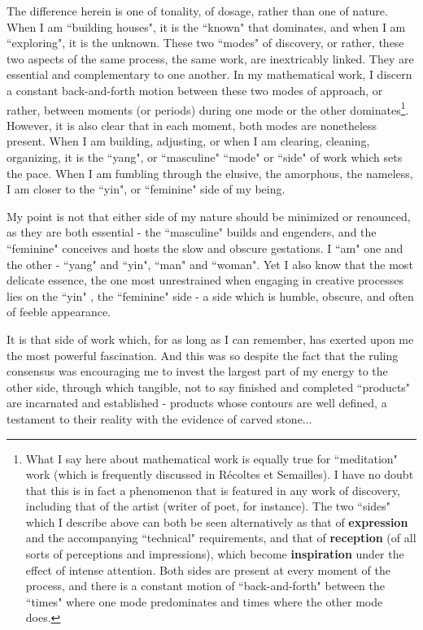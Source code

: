 The difference herein is one of tonality, of dosage, rather than one of nature. When I am ``building houses", it is the ``known" that dominates, and when I am ``exploring", it is the unknown. These two ``modes" of discovery, or rather, these two aspects of the same process, the same work, are inextricably linked. They are essential and complementary to one another. In my mathematical work, I discern a constant back-and-forth motion between these two modes of approach, or rather, between moments (or periods) during one mode or the other dominates\footnote{What I say here about mathematical work is equally true for ``meditation" work (which is frequently discussed in R\'ecoltes et Semailles). I have no doubt that this is in fact a phenomenon that is featured in any work of discovery, including that of the artist (writer of poet, for instance). The two ``sides" which I describe above can both be seen alternatively as that of \textbf{expression} and the accompanying ``technical" requirements, and that of \textbf{reception} (of all sorts of perceptions and impressions), which become \textbf{inspiration} under the effect of intense attention. Both sides are present at every moment of the process, and there is a constant motion of ``back-and-forth" between the ``times" where one mode predominates and times where the other mode does.}. However, it is also clear that in each moment, both modes are nonetheless present. When I am building, adjusting, or when I am clearing, cleaning, organizing, it is the ``yang", or ``masculine" ``mode" or ``side" of work which sets the pace. When I am fumbling through the elusive, the amorphous, the nameless, I am closer to the ``yin", or ``feminine" side of my being.

My point is not that either side of my nature should be minimized or renounced, as they are both essential - the ``masculine" builds and engenders, and the ``feminine" conceives and hosts the slow and obscure gestations. I ``am" one and the other - ``yang" and ``yin", ``man" and ``woman". Yet I also know that the most delicate essence, the one most unrestrained when engaging in creative processes lies on the ``yin" , the ``feminine" side - a side which is humble, obscure, and often of feeble appearance.

It is that side of work which, for as long as I can remember, has exerted upon me the most powerful fascination. And this was so despite the fact that the ruling consensus was encouraging me to invest the largest part of my energy to the other side, through which tangible, not to say finished and completed ``products" are incarnated and established - products whose contours are well defined, a testament to their reality with the evidence of carved stone...

